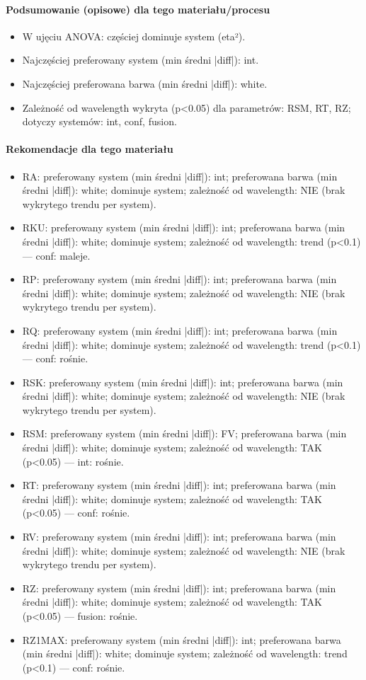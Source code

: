 \documentclass[
  10pt,
]{article}
\begin{document}
\paragraph{Podsumowanie (opisowe) dla tego materiału/procesu}
\begin{itemize}
\item W ujęciu ANOVA: częściej dominuje system (eta²).
\item Najczęściej preferowany system (min średni |diff|): int.
\item Najczęściej preferowana barwa (min średni |diff|): white.
\item Zależność od wavelength wykryta (p<0.05) dla parametrów: RSM, RT, RZ; dotyczy systemów: int, conf, fusion.
\end{itemize}
\paragraph{Rekomendacje dla tego materiału}
\begin{itemize}
\item RA: preferowany system (min średni |diff|): int; preferowana barwa (min średni |diff|): white; dominuje system; zależność od wavelength: NIE (brak wykrytego trendu per system).
\item RKU: preferowany system (min średni |diff|): int; preferowana barwa (min średni |diff|): white; dominuje system; zależność od wavelength: trend (p<0.1) — conf: maleje.
\item RP: preferowany system (min średni |diff|): int; preferowana barwa (min średni |diff|): white; dominuje system; zależność od wavelength: NIE (brak wykrytego trendu per system).
\item RQ: preferowany system (min średni |diff|): int; preferowana barwa (min średni |diff|): white; dominuje system; zależność od wavelength: trend (p<0.1) — conf: rośnie.
\item RSK: preferowany system (min średni |diff|): int; preferowana barwa (min średni |diff|): white; dominuje system; zależność od wavelength: NIE (brak wykrytego trendu per system).
\item RSM: preferowany system (min średni |diff|): FV; preferowana barwa (min średni |diff|): white; dominuje system; zależność od wavelength: TAK (p<0.05) — int: rośnie.
\item RT: preferowany system (min średni |diff|): int; preferowana barwa (min średni |diff|): white; dominuje system; zależność od wavelength: TAK (p<0.05) — conf: rośnie.
\item RV: preferowany system (min średni |diff|): int; preferowana barwa (min średni |diff|): white; dominuje system; zależność od wavelength: NIE (brak wykrytego trendu per system).
\item RZ: preferowany system (min średni |diff|): int; preferowana barwa (min średni |diff|): white; dominuje system; zależność od wavelength: TAK (p<0.05) — fusion: rośnie.
\item RZ1MAX: preferowany system (min średni |diff|): int; preferowana barwa (min średni |diff|): white; dominuje system; zależność od wavelength: trend (p<0.1) — conf: rośnie.
\end{itemize}
\end{document}

